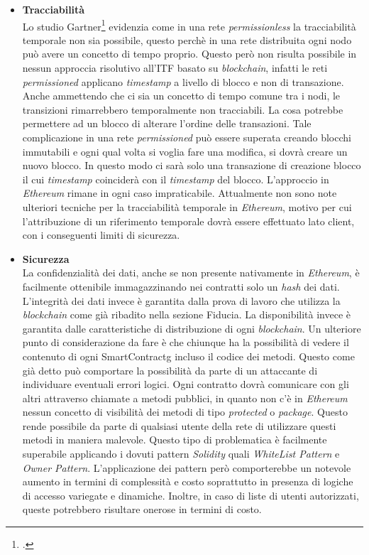 \begin{itemize}
    \item \textbf{Tracciabilità}\\
    Lo studio Gartner\footcite{farah:The-Dawn-of-Decentralized-Identity} evidenzia come in una rete \emph{permissionless} la tracciabilità temporale non sia possibile, questo perchè in una rete distribuita ogni nodo può avere un concetto di tempo proprio. Questo però non risulta possibile in nessun approccia risolutivo all’ITF basato su \emph{blockchain}, infatti le reti \emph{permissioned} applicano \emph{timestamp} a livello di blocco e non di transazione. Anche ammettendo che ci sia un concetto di tempo comune tra i nodi, le transizioni rimarrebbero temporalmente non tracciabili. La cosa potrebbe permettere ad un blocco di alterare l’ordine delle transazioni. 
    Tale complicazione in una rete \emph{permissioned} può essere superata creando blocchi immutabili e ogni qual volta si voglia fare una modifica, si dovrà creare un nuovo blocco. In questo modo ci sarà solo una transazione di creazione blocco il cui \emph{timestamp} coinciderà con il \emph{timestamp} del blocco.
    L'approccio in \emph{Ethereum} rimane in ogni caso impraticabile. Attualmente non sono note ulteriori tecniche per la tracciabilità temporale in \emph{Ethereum}, motivo per cui l’attribuzione di un riferimento temporale dovrà essere effettuato lato client, con i conseguenti limiti di sicurezza. 
    \item \textbf{Sicurezza}\\
    La confidenzialità dei dati, anche se non presente nativamente in \emph{Ethereum}, è facilmente ottenibile immagazzinando nei contratti solo un \emph{hash} dei dati.
    L’integrità dei dati invece è garantita dalla prova di lavoro che utilizza la \emph{blockchain} come già ribadito nella sezione Fiducia.
    La disponibilità invece è garantita dalle caratteristiche di distribuzione di ogni \emph{blockchain}.
    Un ulteriore punto di considerazione da fare è che chiunque ha la possibilità di vedere il contenuto di ogni \gls{SmartContractg} incluso il codice dei metodi. Questo come già detto può comportare la possibilità da parte di un attaccante di individuare eventuali errori logici. Ogni contratto dovrà comunicare con gli altri attraverso chiamate a metodi pubblici, in quanto non c’è in \emph{Ethereum} nessun concetto di visibilità dei metodi di tipo \emph{protected} o \emph{package}. Questo rende possibile da parte di qualsiasi utente della rete di utilizzare questi metodi in maniera malevole. Questo tipo di problematica è facilmente superabile applicando i dovuti pattern \emph{Solidity} quali \emph{WhiteList Pattern} e \emph{Owner Pattern}. L’applicazione dei pattern però comporterebbe un notevole aumento in termini di complessità e costo soprattutto in presenza di logiche di accesso variegate e dinamiche. Inoltre, in caso di liste di utenti autorizzati, queste potrebbero risultare onerose in termini di costo.

\end{itemize}
